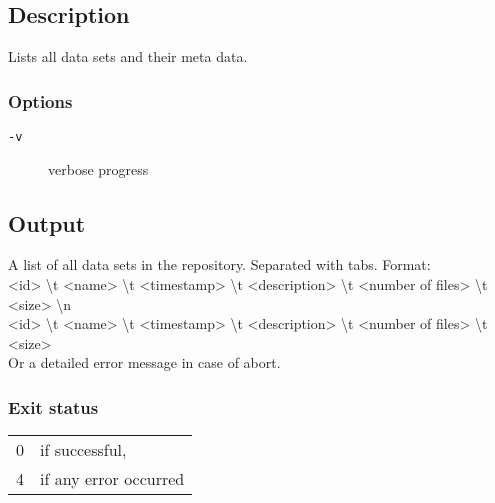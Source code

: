 \documentclass{article} %
\begin{document}
		\subsection*{Description}
		Lists all data sets and their meta data.\\
		
		\subsubsection*{Options}
		\begin{description}
			\item[\texttt{-v}] verbose progress
		\end{description}
		
		\subsection*{Output}
		A list of all data sets in the repository. Separated with tabs. Format:\\<id> \textbackslash t <name> \textbackslash t <timestamp> \textbackslash t <description> \textbackslash t <number of files> \textbackslash t <size> \textbackslash n \\<id> \textbackslash t <name> \textbackslash t <timestamp> \textbackslash t <description> \textbackslash t <number of files> \textbackslash t <size>\\
		Or a detailed error message in case of abort.

		\subsubsection*{Exit status}
		\begin{tabular}{ll}
			0 &  if successful,\\ 
			4 &  if any error occurred\\
		\end{tabular}
\end{document}
